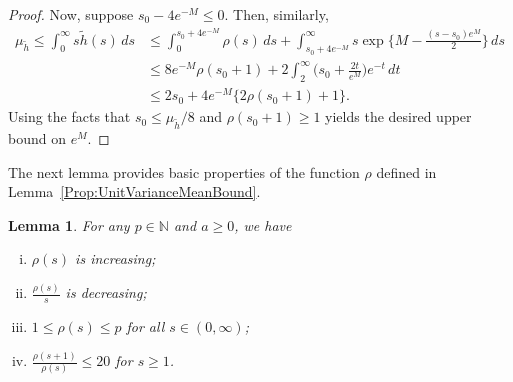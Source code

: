 \documentclass[a4paper,12pt]{article}
\newtheorem{lemma}[theorem]{Lemma}
\begin{document}
\begin{proof}
Now, suppose $s_0 - 4e^{-M} \leq 0$. Then, similarly, 
\begin{align*}
\mu_{\tilde{h}} \leq \int_0^\infty s \tilde{h}(s) \, ds &\leq  \int_0^{s_0 + 4e^{-M}} \rho(s) \, ds + \int_{s_0 + 4e^{-M}}^\infty s \exp\biggl\{M - \frac{(s-s_0)e^M}{2}\biggr\} \, ds \\
                                    &\leq 8e^{-M} \rho(s_0 + 1) + 2\int_2^\infty \biggl(s_0 + \frac{2t}{e^M}\biggr) e^{-t} \, dt \\
                                     &\leq 2s_0 + 4e^{-M}\bigl\{2\rho(s_0 + 1) +1\bigr\}.
\end{align*}
Using the facts that $s_0 \leq \mu_{\tilde{h}}/8$ and $\rho(s_0 + 1) \geq 1$ yields the desired upper bound on $e^M$.
\end{proof}

The next lemma provides basic properties of the function $\rho$ defined in Lemma~\ref{Prop:UnitVarianceMeanBound}.
\begin{lemma}
  \label{Lem:RhoProperties}
  For any $p \in \mathbb{N}$ and $a \geq 0$, we have
  \begin{enumerate}[(i)]
        \item $\rho(s)$ is increasing;
        \item $\frac{\rho(s)}{s}$ is decreasing;
        \item $1 \leq \rho(s) \leq p$ for all $s \in (0,\infty)$;
        \item $\frac{\rho(s+1)}{\rho(s)} \leq 20$ for $s \geq 1$.
    \end{enumerate}
\end{lemma}
\end{document}
